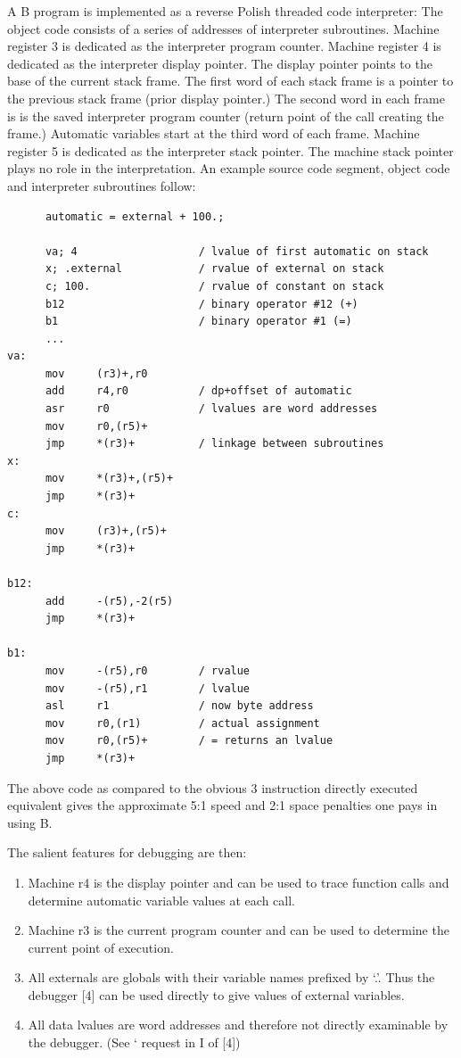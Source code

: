 \documentclass[12pt]{report}
\begin{document}
A B program is implemented as a reverse Polish threaded code
interpreter: The object code consists of a series of addresses of
interpreter subroutines. Machine register 3 is dedicated as the
interpreter program counter. Machine register 4 is dedicated as the
interpreter display pointer. The display pointer points to the base of
the current stack frame. The first word of each stack frame is a
pointer to the previous stack frame (prior display pointer.) The
second word in each frame is is the saved interpreter program counter
(return point of the call creating the frame.) Automatic variables
start at the third word of each frame. Machine register 5 is dedicated
as the interpreter stack pointer. The machine stack pointer plays no
role in the interpretation. An example source code segment, object
code and interpreter subroutines follow:
\begin{verbatim}
      automatic = external + 100.;

      va; 4                   / lvalue of first automatic on stack
      x; .external            / rvalue of external on stack
      c; 100.                 / rvalue of constant on stack
      b12                     / binary operator #12 (+)
      b1                      / binary operator #1 (=)
      ...
va:
      mov     (r3)+,r0
      add     r4,r0           / dp+offset of automatic
      asr     r0              / lvalues are word addresses
      mov     r0,(r5)+
      jmp     *(r3)+          / linkage between subroutines
x:
      mov     *(r3)+,(r5)+
      jmp     *(r3)+
c:
      mov     (r3)+,(r5)+
      jmp     *(r3)+

b12:
      add     -(r5),-2(r5)
      jmp     *(r3)+

b1:
      mov     -(r5),r0        / rvalue
      mov     -(r5),r1        / lvalue
      asl     r1              / now byte address
      mov     r0,(r1)         / actual assignment
      mov     r0,(r5)+        / = returns an lvalue
      jmp     *(r3)+
\end{verbatim}

The above code as compared to the obvious 3 instruction directly
executed equivalent gives the approximate 5:1 speed and 2:1 space
penalties one pays in using B.

The salient features for debugging are then:
\begin{enumerate}
\item Machine r4 is the display pointer and can be used to trace
  function calls and determine automatic variable values at each call.
\item Machine r3 is the current program counter and can be used to
  determine the current point of execution.
\item All externals are globals with their variable names prefixed by
  `.'. Thus the debugger [4] can be used directly to give values of
  external variables.
\item All data lvalues are word addresses and therefore not directly
  examinable by the debugger. (See ` request in I of [4])
\end{enumerate}
  
\end{document}

